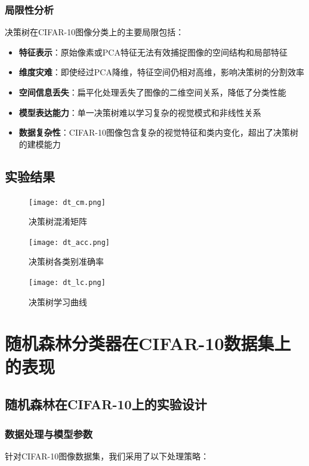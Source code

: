 \documentclass[UTF8]{report}
\theoremstyle{MyLineTheoremStyle} %
\theoremstyle{MyBlockTheoremStyle} %
\theoremstyle{MySubsubsectionStyle} %
\begin{document}
\subsubsection{局限性分析}
决策树在CIFAR-10图像分类上的主要局限包括：
\begin{itemize}
    \item \textbf{特征表示}：原始像素或PCA特征无法有效捕捉图像的空间结构和局部特征
    \item \textbf{维度灾难}：即使经过PCA降维，特征空间仍相对高维，影响决策树的分割效率
    \item \textbf{空间信息丢失}：扁平化处理丢失了图像的二维空间关系，降低了分类性能
    \item \textbf{模型表达能力}：单一决策树难以学习复杂的视觉模式和非线性关系
    \item \textbf{数据复杂性}：CIFAR-10图像包含复杂的视觉特征和类内变化，超出了决策树的建模能力
\end{itemize}
\subsection{实验结果}

\begin{figure}[H]
    \centering
    \texttt{[image: dt\_cm.png]}
    \caption{决策树混淆矩阵}
    \label{fig:dt_confusion_matrix}
\end{figure}

\begin{figure}[H]
    \centering
    \texttt{[image: dt\_acc.png]}
    \caption{决策树各类别准确率}
    \label{fig:dt_class_accuracy}
\end{figure}

\begin{figure}[H]
    \centering
    \texttt{[image: dt\_lc.png]}
    \caption{决策树学习曲线}
    \label{fig:dt_learning_curve}
\end{figure}





\section{随机森林分类器在CIFAR-10数据集上的表现}

\subsection{随机森林在CIFAR-10上的实验设计}

\subsubsection{数据处理与模型参数}
针对CIFAR-10图像数据集，我们采用了以下处理策略：
\end{document}
